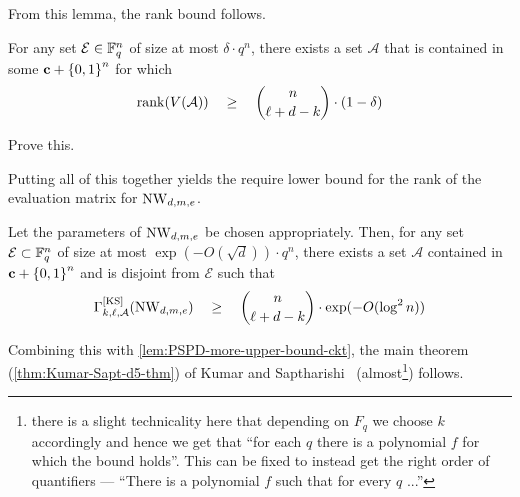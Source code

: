 From this lemma, the rank bound follows. 

\begin{lemma}
For any set $\mathcal{E} \in \mathbb{F}_q^n$ of size at most $\delta \cdot q^n$, there exists a set $\mathcal{A}$ that is contained in some $\mathbf{c} + \left\{0,1\right\}^n$ for which 
\[
\operatorname{rank}(V(\mathcal{A})) \quad \geq \quad \binom{n}{\ell + d - k} \cdot (1 - \delta)
\] 
\end{lemma}
\begin{exercise}
Prove this. 
\end{exercise}

Putting all of this together yields the require lower bound for the rank of the evaluation matrix for $\operatorname{\mathrm{NW}}_{d,m,e}$. 

\begin{lemma}
Let the parameters of $\operatorname{\mathrm{NW}}_{d,m,e}$ be chosen appropriately. Then, for any set $\mathcal{E} \subset \mathbb{F}_q^n$ of size at most $\exp(-O(\sqrt{d})) \cdot q^n$, there exists a set $\mathcal{A}$ contained in $\mathbf{c} + \left\{0,1\right\}^n$ and is disjoint from $\mathcal{E}$ such that
\[
\Gamma^{\mathrm{[KS]}}_{k,\ell,\mathcal{A}}(\operatorname{\mathrm{NW}}_{d,m,e}) \quad \geq \quad \binom{n}{\ell + d - k} \cdot \exp(-O(\log^2 n))
\]
\end{lemma}

Combining this with \ref{lem:PSPD-more-upper-bound-ckt}, the main theorem (\autoref{thm:Kumar-Sapt-d5-thm}) of Kumar and Saptharishi~\cite{KumarSapt15} (almost\footnote{there is a slight technicality here that depending on $F_q$ we choose $k$ accordingly and hence we get that ``for each $q$ there is a polynomial $f$ for which the bound holds''.
This can be fixed to instead get the right order of quantifiers --- ``There is a polynomial $f$ such that for every $q$ ...''})
follows.

